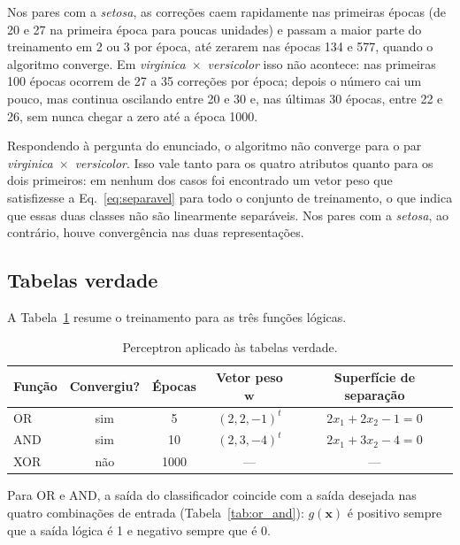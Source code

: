 \documentclass[12pt,a4paper]{article}
\begin{document}
Nos pares com a \emph{setosa}, as correções caem rapidamente nas primeiras épocas (de 20 e 27 na primeira época para poucas unidades) e passam a maior parte do treinamento em 2 ou 3 por época, até zerarem nas épocas 134 e 577, quando o algoritmo converge. Em \emph{virginica}~$\times$~\emph{versicolor} isso não acontece: nas primeiras 100 épocas ocorrem de 27 a 35 correções por época; depois o número cai um pouco, mas continua oscilando entre 20 e 30 e, nas últimas 30 épocas, entre 22 e 26, sem nunca chegar a zero até a época 1000.

Respondendo à pergunta do enunciado, o algoritmo não converge para o par \emph{virginica}~$\times$~\emph{versicolor}. Isso vale tanto para os quatro atributos quanto para os dois primeiros: em nenhum dos casos foi encontrado um vetor peso que satisfizesse a Eq.~\eqref{eq:separavel} para todo o conjunto de treinamento, o que indica que essas duas classes não são linearmente separáveis. Nos pares com a \emph{setosa}, ao contrário, houve convergência nas duas representações.

\subsection{Tabelas verdade}

A Tabela~\ref{tab:logica} resume o treinamento para as três funções lógicas.

\begin{table}[H]
\centering
\caption{Perceptron aplicado às tabelas verdade.}
\label{tab:logica}
\begin{tabular}{lcccc}
\toprule
Função & Convergiu? & Épocas & Vetor peso $\mathbf{w}$ & Superfície de separação \\
\midrule
OR  & sim & 5    & $(2, 2, -1)^t$ & $2x_1 + 2x_2 - 1 = 0$ \\
AND & sim & 10   & $(2, 3, -4)^t$ & $2x_1 + 3x_2 - 4 = 0$ \\
XOR & não & 1000 & ---            & --- \\
\bottomrule
\end{tabular}
\end{table}

Para OR e AND, a saída do classificador coincide com a saída desejada nas quatro combinações de entrada (Tabela~\ref{tab:or_and}): $g(\mathbf{x})$ é positivo sempre que a saída lógica é 1 e negativo sempre que é 0.
\end{document}
